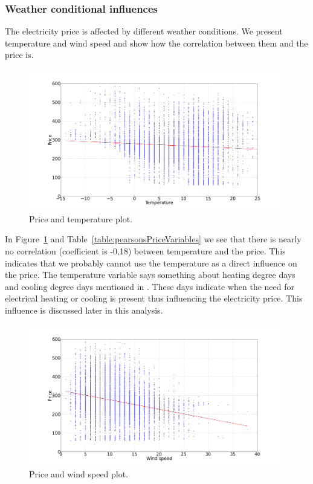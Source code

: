 \subsubsection{Weather conditional influences}
\label{sec:priceWeatherInfluence}
The electricity price is affected by different weather conditions. We present temperature and wind speed and show how the correlation between them and the price is.

\begin{figure}[H]
\centering
\includegraphics[width=0.99\textwidth]{billeder/energy_price_plots/price_temp.png}
\caption{Price and temperature plot.}
\label{fig:price_temp}
\end{figure}

In Figure~\ref{fig:price_temp} and Table~\ref{table:pearsonsPriceVariables} we see that there is nearly no correlation (coefficient is -0,18) between temperature and the price. This indicates that we probably cannot use the temperature as a direct influence on the price. The temperature variable says something about heating degree days and cooling degree days mentioned in \cite{19}. These days indicate when the need for electrical heating or cooling is present thus influencing the electricity price. This influence is discussed later in this analysis.

\begin{figure}[H]
\centering
\includegraphics[width=0.99\textwidth]{billeder/energy_price_plots/price_wind.png}
\caption{Price and wind speed plot.}
\label{fig:price_wind}
\end{figure}

